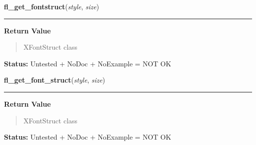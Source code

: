     \label{xformslib:library:fl_get_fontstruct}

    \vspace{0.5ex}

\hspace{.8\funcindent}\begin{boxedminipage}{\funcwidth}

    \raggedright \textbf{fl\_get\_fontstruct}(\textit{style}, \textit{size})

    \vspace{-1.5ex}

    \rule{\textwidth}{0.5\fboxrule}
\setlength{\parskip}{2ex}
\setlength{\parskip}{1ex}
      \textbf{Return Value}
    \vspace{-1ex}

      \begin{quote}
      XFontStruct class

      \end{quote}

\textbf{Status:} Untested + NoDoc + NoExample = NOT OK



    \end{boxedminipage}

    \label{xformslib:library:fl_get_fontstruct}

    \vspace{0.5ex}

\hspace{.8\funcindent}\begin{boxedminipage}{\funcwidth}

    \raggedright \textbf{fl\_get\_font\_struct}(\textit{style}, \textit{size})

    \vspace{-1.5ex}

    \rule{\textwidth}{0.5\fboxrule}
\setlength{\parskip}{2ex}
\setlength{\parskip}{1ex}
      \textbf{Return Value}
    \vspace{-1ex}

      \begin{quote}
      XFontStruct class

      \end{quote}

\textbf{Status:} Untested + NoDoc + NoExample = NOT OK



    \end{boxedminipage}

